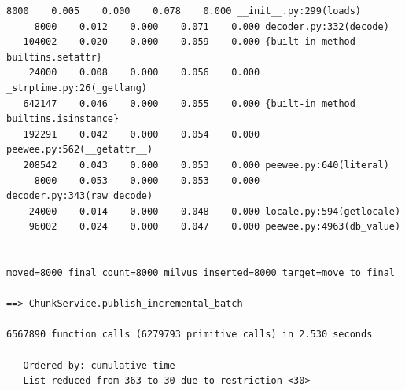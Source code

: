\documentclass[a4paper,12pt]{article}
\begin{document}
\begin{lstlisting}[basicstyle=\ttfamily\fontsize{9}{9}\selectfont]
     8000    0.005    0.000    0.078    0.000 __init__.py:299(loads)
     8000    0.012    0.000    0.071    0.000 decoder.py:332(decode)
   104002    0.020    0.000    0.059    0.000 {built-in method builtins.setattr}
    24000    0.008    0.000    0.056    0.000 _strptime.py:26(_getlang)
   642147    0.046    0.000    0.055    0.000 {built-in method builtins.isinstance}
   192291    0.042    0.000    0.054    0.000 peewee.py:562(__getattr__)
   208542    0.043    0.000    0.053    0.000 peewee.py:640(literal)
     8000    0.053    0.000    0.053    0.000 decoder.py:343(raw_decode)
    24000    0.014    0.000    0.048    0.000 locale.py:594(getlocale)
    96002    0.024    0.000    0.047    0.000 peewee.py:4963(db_value)


moved=8000 final_count=8000 milvus_inserted=8000 target=move_to_final

==> ChunkService.publish_incremental_batch

6567890 function calls (6279793 primitive calls) in 2.530 seconds

   Ordered by: cumulative time
   List reduced from 363 to 30 due to restriction <30>


\end{lstlisting}
\end{document}
